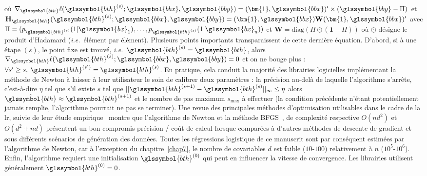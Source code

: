où $ \nabla_{\glssymbol{bth}} \ell(\glssymbol{bth}^{(s)};\glssymbol{bbx},\glssymbol{bby}) = (\bm{1},\glssymbol{bbx})' \times (\glssymbol{bby} - \Pi)$ et $\mathbf{H}_{{\glssymbol{bth}}}(\glssymbol{bth}^{(s)};\glssymbol{bbx},\glssymbol{bby}) = (\bm{1},\glssymbol{bbx}) \mathbf{W} (\bm{1},\glssymbol{bbx})'$ avec $\Pi = (p_{\glssymbol{bth}^{(s)}}(1|\glssymbol{bx}_1),\dots,p_{\glssymbol{bth}^{(s)}}(1|\glssymbol{bx}_n))$ et $\mathbf{W} = \text{diag}(\Pi \odot (\bm{1}-\Pi))$ où $\odot$ désigne le produit d'Hadamard (\textit{i.e.}\ élément par élément). Plusieurs points importants transparaissent de cette dernière équation. D'abord, si à une étape $(s)$, le point fixe est trouvé, \textit{i.e.}\ $\glssymbol{bth}^{(s)} = \hat{\glssymbol{bth}}$, alors $\nabla_{\glssymbol{bth}} \ell(\glssymbol{bth}^{(s)};\glssymbol{bbx},\glssymbol{bby}) = 0$ et on ne bouge plus : $\forall s' \geq s, \: \glssymbol{bth}^{(s')} = \glssymbol{bth}^{(s)}$. En pratique, cela conduit la majorité des librairies logicielles implémentant la méthode de Newton à laisser à leur utilisateur le soin de calibrer deux paramètres : la précision au-delà de laquelle l'algorithme s'arrête, c'est-à-dire $\eta$ tel que s'il existe $s$ tel que $||\glssymbol{bth}^{(s+1)} - \glssymbol{bth}^{(s)}||_{\infty} \leq \eta$ alors $\hat{\glssymbol{bth}} \approx \glssymbol{bth}^{(s+1)}$ et le nombre de pas maximum $s_{\text{max}}$ à effectuer (la condition précédente n'étant potentiellement jamais remplie, l'algorithme pourrait ne pas se terminer). Une revue des principales méthodes d'optimisation utilisables dans le cadre de la \gls{lr}, suivie de leur étude empirique~\cite{minka2003comparison} montre que l'algorithme de Newton et la méthode BFGS~\cite{byrd1995limited}, de complexité respective $O(nd^2)$ et $O(d^2 + nd)$ présentent un bon compromis précision / coût de calcul lorsque comparées à d'autres méthodes de descente de gradient et sous différents scénarios de génération des données. Toutes les régressions logistique de ce manuscrit sont par conséquent estimées par l'algorithme de Newton, car à l'exception du chapitre~\ref{chap7}, le nombre de covariables $d$ est faible ($10$-$100$) relativement à $n$ ($10^5$-$10^6$). Enfin, l'algorithme requiert une initialisation $\glssymbol{bth}^{(0)}$ qui peut en influencer la vitesse de convergence. Les librairies utilisent généralement $\glssymbol{bth}^{(0)}=0$.

